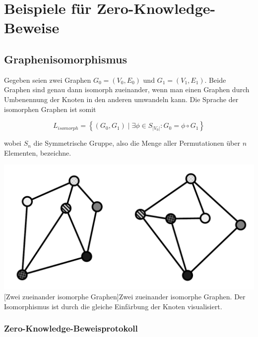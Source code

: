 \section{Beispiele für Zero-Knowledge-Beweise}

\subsection{Graphenisomorphismus}
\begin{definition}[Graphenisomorphismus]
Gegeben seien zwei Graphen \( G_0 = \left( V_0, E_0 \right) \) und \( G_1 = \left( V_1, E_1 \right) \). Beide Graphen sind genau dann isomorph zueinander, wenn man einen Graphen durch Umbenennung der Knoten in den anderen umwandeln kann. Die Sprache der isomorphen Graphen ist somit

\[ L_{isomorph} = \left\lbrace \left( G_0, G_1 \right) \mid \exists \phi \in S_{\left| V_0 \right|}: G_0 = \phi \circ G_1 \right\rbrace \]

wobei \( S_n \) die \textnormal{Symmetrische Gruppe}, also die Menge aller Permutationen über \( n \) Elementen, bezeichne.
\end{definition}
 
\vspace{1em}
\begin{minipage}{\linewidth}
	\centering
	\includegraphics[width=0.7\linewidth]{img/isomorphism-example.pdf}
	[Zwei zueinander isomorphe Graphen]{Zwei zueinander isomorphe Graphen. Der Isomorphismus ist durch die gleiche Einfärbung der Knoten visualisiert.}
	\label{fig:isomorphism}
\end{minipage}

\subsubsection{Zero-Knowledge-Beweisprotokoll}

